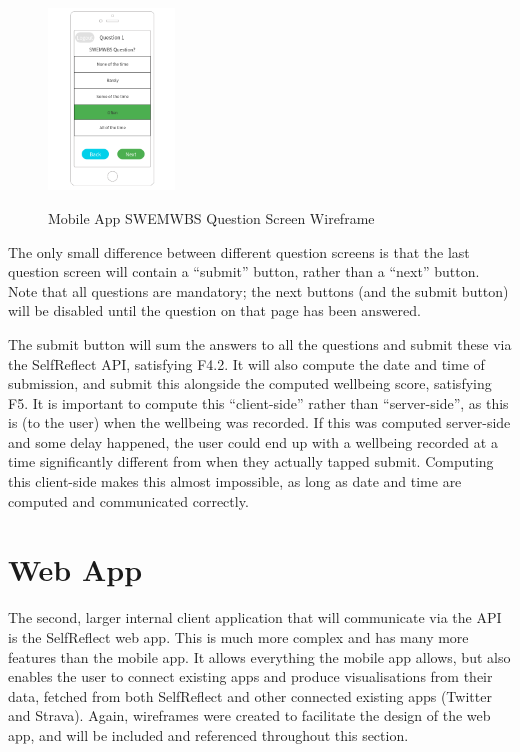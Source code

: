\documentclass[11pt,openright,a4paper]{report}
\begin{document}
\begin{figure}[ht]
\centering
\caption{Mobile App SWEMWBS Question Screen Wireframe}
\includegraphics[width=0.3\textwidth]{i/mobilequestion.png}
\label{fig:mobilequestion}
\end{figure}

The only small difference between different question screens is that the last question screen will contain a \enquote{submit} button, rather than a \enquote{next} button. Note that all questions are mandatory; the next buttons (and the submit button) will be disabled until the question on that page has been answered.

The submit button will sum the answers to all the questions and submit these via the SelfReflect API, satisfying F4.2. It will also compute the date and time of submission, and submit this alongside the computed wellbeing score, satisfying F5. It is important to compute this \enquote{client-side} rather than \enquote{server-side}, as this is (to the user) when the wellbeing was recorded. If this was computed server-side and some delay happened, the user could end up with a wellbeing recorded at a time significantly different from when they actually tapped submit. Computing this client-side makes this almost impossible, as long as date and time are computed and communicated correctly.

\section{Web App} \label{sec:webappdesign}
The second, larger internal client application that will communicate via the API is the SelfReflect web app. This is much more complex and has many more features than the mobile app. It allows everything the mobile app allows, but also enables the user to connect existing apps and produce visualisations from their data, fetched from both SelfReflect and other connected existing apps (Twitter and Strava). Again, wireframes were created to facilitate the design of the web app, and will be included and referenced throughout this section.
\end{document}
